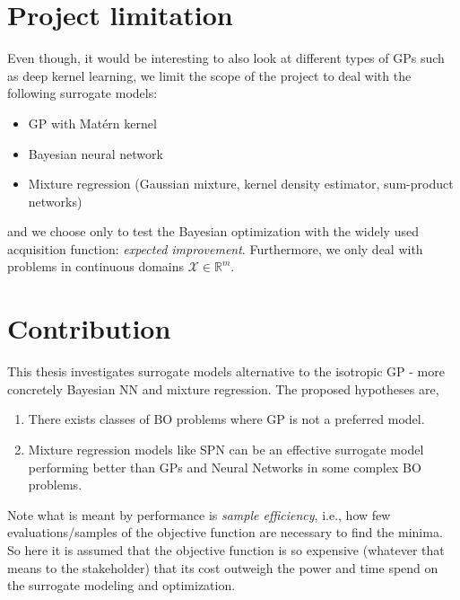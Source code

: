  \section{Project limitation}
Even though, it would be interesting to also look at different types of GPs such as deep kernel
learning, we limit the scope of the project to deal with the following surrogate models:
\begin{itemize}[noitemsep]
    \item GP with Matérn kernel
    \item Bayesian neural network
    \item Mixture regression (Gaussian mixture, kernel density estimator, sum-product networks)
\end{itemize}
and we choose only to test the Bayesian optimization with the widely used acquisition function:
\textit{expected improvement}. Furthermore, we only deal with problems in continuous domains
$\mathcal{X} \in \mathbb{R}^m$.

\section{Contribution}
This thesis investigates surrogate models alternative to the isotropic GP - more concretely Bayesian NN
and mixture regression. The proposed hypotheses are,


\begin{enumerate}[noitemsep]
    \item There exists classes of BO problems where GP is not a preferred model. 
    \item Mixture regression models like SPN can be an effective surrogate model
    performing better than GPs and Neural Networks in some complex BO problems. 
\end{enumerate}


Note what is meant by performance is \textit{sample efficiency}, i.e., how few evaluations/samples
of the objective function are necessary to find the minima. So here it is assumed that the objective
function is so expensive (whatever that means to the stakeholder) that its cost outweigh the power
and time spend on the surrogate modeling and optimization.


    

